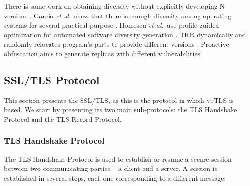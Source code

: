\documentclass{sig-alternate-05-2015}
\begin{document}
There is some work on obtaining diversity without explicitly  developing N versions \cite{larsen2014sok}. Garcia \emph{et al.}~show that there is enough diversity among operating systems for several practical purpose \cite{Garcia:11}. Homescu \emph{et al.}~use profile-guided optimization for automated software diversity generation \cite{homescu2013profile}. TRR dynamically and randomly relocates program's parts to provide different versions \cite{xu2003transparent}. Proactive obfuscation aims to generate replicas with different vulnerabilities \cite{Roeder:10}



\subsection{SSL/TLS Protocol}


This section presents the SSL/TLS, as this is the protocol in which \textsc{vtTLS} is based. We start by presenting its two main sub-protocols: the TLS Handshake Protocol and the TLS Record Protocol.

\subsubsection{TLS Handshake Protocol}

The TLS Handshake Protocol is used to establish or resume a secure session between two communicating parties -- a client and a server.
A session is established in several steps, each one corresponding to a different message:
\end{document}
